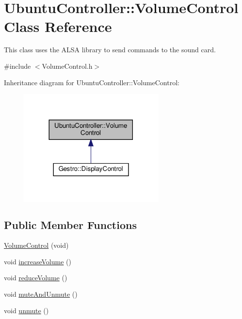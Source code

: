 \hypertarget{classUbuntuController_1_1VolumeControl}{}\section{Ubuntu\+Controller\+:\+:Volume\+Control Class Reference}
\label{classUbuntuController_1_1VolumeControl}


This class uses the A\+L\+SA library to send commands to the sound card.  




{\ttfamily \#include $<$Volume\+Control.\+h$>$}



Inheritance diagram for Ubuntu\+Controller\+:\+:Volume\+Control\+:
\nopagebreak
\begin{figure}[H]
\begin{center}
\leavevmode
\includegraphics[width=209pt]{classUbuntuController_1_1VolumeControl__inherit__graph}
\end{center}
\end{figure}
\subsection*{Public Member Functions}
\begin{DoxyCompactItemize}
\item 
\hyperlink{classUbuntuController_1_1VolumeControl_a3cc73bb232bd87f8385da0440126c38c}{Volume\+Control} (void)
\item 
void \hyperlink{classUbuntuController_1_1VolumeControl_a6b51293368c1740b9bee0b8a4e7ed421}{increase\+Volume} ()
\item 
void \hyperlink{classUbuntuController_1_1VolumeControl_ad8e3e3740268388e906984fa807761a1}{reduce\+Volume} ()
\item 
void \hyperlink{classUbuntuController_1_1VolumeControl_a77273bc06d0f25068045860b0c6b4f91}{mute\+And\+Unmute} ()
\item 
void \hyperlink{classUbuntuController_1_1VolumeControl_a4a541c510e22cd07b206ca80f979c1a1}{unmute} ()
\end{DoxyCompactItemize}


